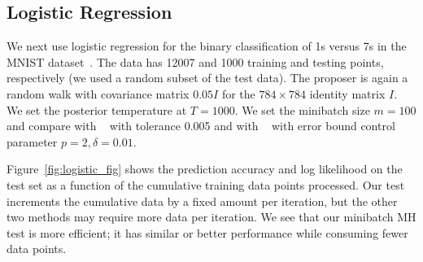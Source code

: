 \documentclass{article}
\begin{document}

\subsection{Logistic Regression}\label{ssec:logistic}

We next use logistic regression for the binary classification of 1s versus 7s in the MNIST
dataset~\cite{lecun-mnisthandwrittendigit-2010}. The data has 12007 and 1000 training and testing
points, respectively (we used a random subset of the test data). The proposer is again a random walk
with covariance matrix $0.05I$ for the $784\times 784$ identity matrix $I$. We set the posterior
temperature at $T=1000$. We set the minibatch size $m=100$ and compare with ~\cite{cutting_mh_2014} with
tolerance 0.005 and with ~\cite{icml2014c1_bardenet14} with error bound control parameter $p = 2, \delta = 0.01$.

Figure~\ref{fig:logistic_fig} shows the prediction accuracy and log likelihood on the test set as a
function of the cumulative training data points processed. Our test increments the cumulative data
by a fixed amount per iteration, but the other two methods may require more data per iteration.  We
see that our minibatch MH test is more efficient; it has similar or better performance while
consuming fewer data points.
\end{document}
